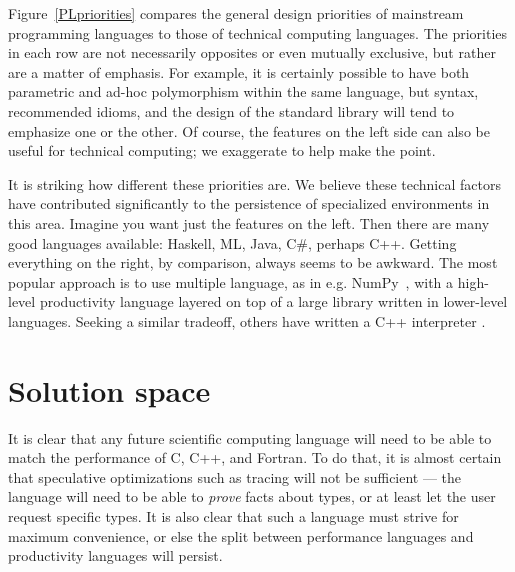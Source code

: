 Figure~\ref{PLpriorities} compares the general design priorities of mainstream programming
languages to those of technical computing languages. The priorities in each row are not
necessarily opposites or even mutually exclusive, but rather are a matter of emphasis.
For example, it is certainly possible to have both parametric and ad-hoc polymorphism within
the same language, but syntax, recommended idioms, and the design of the standard library will
tend to emphasize one or the other. Of course, the features on the left side can
also be useful for technical computing; we exaggerate to help make the point.

It is striking how different these priorities are. We believe these technical factors have
contributed significantly to the persistence of specialized environments in this area.
Imagine you want just the features on the left. Then there are many good
languages available: Haskell, ML, Java, C\#, perhaps C++.
Getting everything on the right, by comparison, always seems to be awkward.
The most popular approach is to use multiple language, as in e.g. NumPy~\cite{numpy},
with a high-level productivity language layered on top of a large library
written in lower-level languages. Seeking a similar tradeoff,
others have written a C++ interpreter \cite{vasilev2012cling}.






\section{Solution space}

It is clear that any future scientific computing language will need to be able to
match the performance of C, C++, and Fortran. To do that, it is almost certain
that speculative optimizations such as tracing \cite{tracingjit} will not be sufficient ---
the language will need to be able to \emph{prove} facts about types, or at least
let the user request specific types. It is also clear that such a language must
strive for maximum convenience, or else the split between performance languages
and productivity languages will persist.

